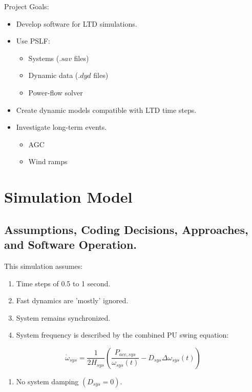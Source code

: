 \documentclass[14pt, unknownkeysallowed]{beamer}
\newcounter{assumptions}
\begin{document}
\begin{frame}
Project Goals:
\begin{itemize}
	\item Develop software for LTD simulations.
	\item Use PSLF:
	\begin{itemize}
		\item Systems ($.sav$ files)
		\item Dynamic data ($.dyd$ files)
		\item Power-flow solver
	\end{itemize}
	\item Create dynamic models compatible with LTD time steps.
	\item Investigate long-term events.
	\begin{itemize}
		\item AGC
		\item Wind ramps
	\end{itemize}
\end{itemize}
\end{frame}

\section{Simulation Model}
\subsection{Assumptions, Coding Decisions, Approaches, and Software Operation.}
\begin{frame}
This simulation assumes:
\begin{enumerate}
\item Time steps of 0.5 to 1 second.
\item Fast dynamics are 'mostly' ignored.
\item System remains synchronized.
\item System frequency is described by the combined PU swing equation:
\setcounter{assumptions}{\value{enumi}} %
\end{enumerate}
\[ \dot{\omega}_{sys} = \dfrac{1}{2H_{sys} } \left( \dfrac{P_{acc, sys} }{\omega_{sys}(t)} - D_{sys}\Delta\omega_{sys}(t)  \right)\] 
\begin{enumerate}
\setcounter{enumi}{\value{assumptions}}
\item No system damping $(D_{sys} = 0)$.
\end{enumerate}
\end{frame}
\end{document}
